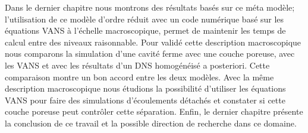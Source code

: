 Dans le dernier chapitre nous montrons des résultats basés sur ce méta modèle; l’utilisation de ce modèle d’ordre réduit avec un code numérique basé sur les équations VANS à l’échelle macroscopique, permet de maintenir les temps de calcul entre des niveaux raisonnable.
Pour validé cette description macroscopique nous comparons la simulation d'une cavité ferme avec une couche poreuse, avec les VANS et avec les résultats d’un DNS homogénéisé a posteriori. 
Cette comparaison montre un bon accord entre les deux modèles.
Avec la même description macroscopique nous étudions la possibilité d’utiliser les équations VANS pour faire des simulations d’écoulements détachés et constater si cette couche poreuse peut contrôler cette séparation.
Enfin, le dernier chapitre présente la conclusion de ce travail et la possible direction de recherche dans ce domaine.